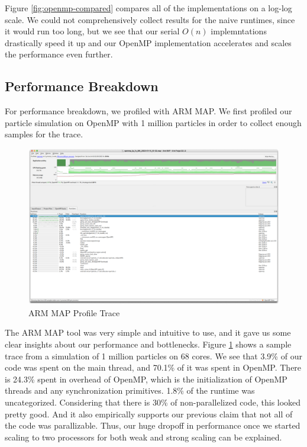 \documentclass{article}
\begin{document}
Figure \ref{fig:openmp-compared} compares all of the implementations on a log-log scale. We could not comprehensively collect results for the naive runtimes, since it would run too long, but we see that our serial $O(n)$ implemntations drastically speed it up and our OpenMP implementation accelerates and scales the performance even further.

\subsection{Performance Breakdown}
For performance breakdown, we profiled with ARM MAP. We first profiled our particle simulation on OpenMP with 1 million particles in order to collect enough samples for the trace.

\begin{figure}[H]
	\centering
	\includegraphics[width=6in]{figures/openmp-profile.png}
	\caption{ARM MAP Profile Trace}
	\label{fig:openmp-profile-trace}
\end{figure}

The ARM MAP tool was very simple and intuitive to use, and it gave us some clear insights about our performance and bottlenecks. Figure \ref{fig:openmp-profile-trace} shows a sample trace from a simulation of 1 million particles on 68 cores. We see that 3.9\% of our code was spent on the main thread, and 70.1\% of it was spent in OpenMP. There is 24.3\% spent in overhead of OpenMP, which is the initialization of OpenMP threads and any synchronization primitives. 1.8\% of the runtime was uncategorized. Considering that there is 30\% of non-parallelized code, this looked pretty good. And it also empirically supports our previous claim that not all of the code was parallizable. Thus, our huge dropoff in performance once we started scaling to two processors for both weak and strong scaling can be explained.
\end{document}
